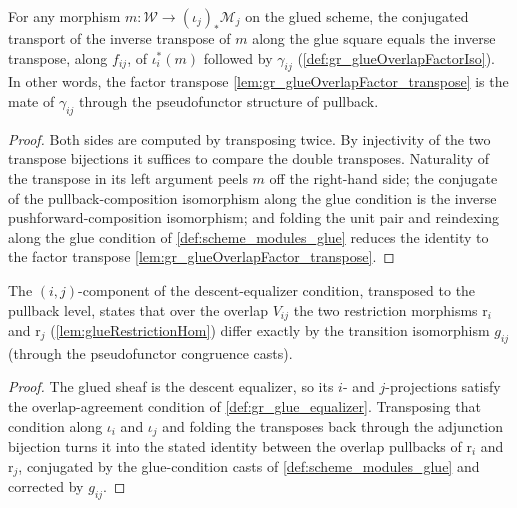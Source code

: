 \begin{lemma}\leanok
  \label{lem:gr_glueOverlapFactor_mate}
  For any morphism \(m : \mathcal{W} \to (\iota_j)_{*}\mathcal{M}_j\) on the glued
  scheme, the conjugated transport of the inverse transpose of \(m\) along the glue
  square equals the inverse transpose, along \(f_{ij}\), of \(\iota_i^{*}(m)\) followed
  by \(\gamma_{ij}\) (\cref{def:gr_glueOverlapFactorIso}). In other words, the factor
  transpose \cref{lem:gr_glueOverlapFactor_transpose} is the mate of \(\gamma_{ij}\)
  through the pseudofunctor structure of pullback.
\end{lemma}
\begin{proof}
    \leanok
  Both sides are computed by transposing twice. By injectivity of the two transpose
  bijections it suffices to compare the double transposes. Naturality of the transpose
  in its left argument peels \(m\) off the right-hand side; the conjugate of the
  pullback-composition isomorphism along the glue condition is the inverse
  pushforward-composition isomorphism; and folding the unit pair and reindexing along
  the glue condition of \cref{def:scheme_modules_glue} reduces the identity to the
  factor transpose \cref{lem:gr_glueOverlapFactor_transpose}.
\end{proof}

\begin{lemma}\leanok
  \label{lem:gr_glueRestriction_overlap_compat}
  The \((i,j)\)-component of the descent-equalizer condition, transposed to the
  pullback level, states that over the overlap \(V_{ij}\) the two restriction
  morphisms \(\mathrm{r}_i\) and \(\mathrm{r}_j\) (\cref{lem:glueRestrictionHom}) differ
  exactly by the transition isomorphism \(g_{ij}\) (through the pseudofunctor
  congruence casts).
\end{lemma}
\begin{proof}
  \leanok
  The glued sheaf is the descent equalizer, so its \(i\)- and \(j\)-projections satisfy
  the overlap-agreement condition of \cref{def:gr_glue_equalizer}. Transposing that
  condition along \(\iota_i\) and \(\iota_j\) and folding the transposes back through
  the adjunction bijection turns it into the stated identity between the overlap
  pullbacks of \(\mathrm{r}_i\) and \(\mathrm{r}_j\), conjugated by the glue-condition
  casts of \cref{def:scheme_modules_glue} and corrected by \(g_{ij}\).
\end{proof}

